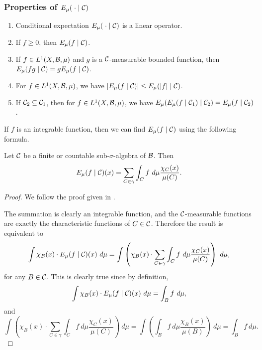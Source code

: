 \subsubsection{Properties of \texorpdfstring{$E_\mu(\mathrel{}\cdot\mathrel{} \mid \mathcal{C})$}{the conditional expectation operator}}
\begin{enumerate}
	\item Conditional expectation $E_\mu(\mathrel{}\cdot\mathrel{} \mid \mathcal{C})$ is a linear operator. \label{cond-exp:1}
	\item If $f \geq 0$, then $E_\mu(f \mid \mathcal{C})$. \label{cond-exp:2}
	\item If $f \in L^1(X, \mathcal{B}, \mu)$ and $g$ is a $\mathcal{C}$-measurable bounded function, then $E_\mu(fg \mid \mathcal{C}) = gE_\mu(f \mid \mathcal{C})$. \label{cond-exp:3}
	\item For $f \in L^1(X, \mathcal{B}, \mu)$, we have $\left|E_\mu(f \mid \mathcal{C})\right| \leq E_\mu(|f| \mid \mathcal{C})$. \label{cond-exp:4}
	\item If $\mathcal{C}_2 \subseteq \mathcal{C}_1$, then for $f \in L^1(X, \mathcal{B}, \mu)$, we have $E_\mu(E_\mu(f \mid \mathcal{C}_1) \mid \mathcal{C}_2) = E_\mu(f \mid \mathcal{C}_2)$. \label{cond-exp:5}
\end{enumerate}

If $f$ is an integrable function, then we can find $E_\mu(f \mid \mathcal{C})$ using the following formula.

\begin{proposition}
	Let $\mathcal{C}$ be a finite or countable sub-$\sigma$-algebra of $\mathcal{B}$. Then
	\[
		E_\mu(f \mid \mathcal{C})(x) = \sum_{C \in \gamma}{\int_{C}{f\ d\mu}\frac{\chi_{C}(x)}{\mu(C)}}.
	\]
	
	\begin{proof}
		We follow the proof given in \cite[Example 10.1.2]{bogachev:measure}.
		
		The summation is clearly an integrable function, and the $\mathcal{C}$-measurable functions are exactly the characteristic functions of $C \in \mathcal{C}$. Therefore the result is equivalent to
		\[
			\int{\chi_B(x) \cdot E_\mu(f \mid \C)(x)\ d\mu} = \int{\left(\chi_B(x) \cdot \sum_{C \in \gamma}{\int_{C}{f\ d\mu}\frac{\chi_{C}(x)}{\mu(C)}}\right)\ d\mu},
		\]
		for any $B \in \mathcal{C}$. This is clearly true since by definition,
		\[
			\int{\chi_B(x) \cdot E_\mu(f \mid \mathcal{C})(x)\ d\mu} = \int_B{f\ d\mu},
		\]
		and
		\[
			\int{\left(\chi_B(x) \cdot \sum_{C \in \gamma}{\int_{C}{f\ d\mu}\frac{\chi_{C}(x)}{\mu(C)}}\right)\ d\mu} = \int{\left({\int_{B}{f\ d\mu}\frac{\chi_{B}(x)}{\mu(B)}}\right)\ d\mu} = \int_{B}{f\ d\mu}.
		\]
	\end{proof}
\end{proposition}

